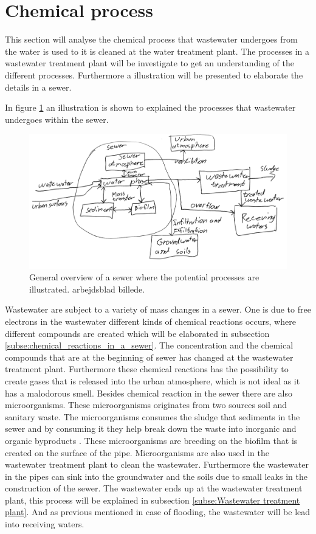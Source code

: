 \section{Chemical process}\label{se:chemical_process}
This section will analyse the chemical process that wastewater undergoes from the water is used to it is cleaned at the water treatment plant. The processes in a wastewater treatment plant will be investigate to get an understanding of the different processes. Furthermore a illustration will be presented to elaborate the details in a sewer. 

In figure \ref{fig:sewer_overview_of_the_different_parts} an illustration is shown to explained the processes that wastewater undergoes within the sewer.
\begin{figure}[H]
\centering
\includegraphics[width=1\textwidth]{report/introduction/pictures/detailed_sewer.pdf}
\caption{General overview of a sewer where the potential processes are illustrated. arbejdsblad billede. }
\label{fig:sewer_overview_of_the_different_parts}
\end{figure}
Wastewater are subject to a variety of mass changes in a sewer. One is due to free electrons in the wastewater different kinds of chemical reactions occurs, where different compounds are created which will be elaborated in subsection \ref{subse:chemical_reactions_in_a_sewer}. The concentration and the chemical compounds that are at the beginning of sewer has changed at the wastewater treatment plant. Furthermore these chemical reactions has the possibility to create gases that is released into the urban atmosphere, which is not ideal as it has a malodorous smell. Besides chemical reaction in the sewer there are also microorganisms. These microorganisms originates from two sources soil and sanitary waste. The microorganisms consumes the sludge that sediments in the sewer and by consuming it they help break down the waste into inorganic and organic byproducts \cite{bacteria_sewer}. These microorganisms are breeding on the biofilm that is created on the surface of the pipe. Microorganisms are also used in the wastewater treatment plant to clean the wastewater. Furthermore the wastewater in the pipes can sink into the groundwater and the soils due to small leaks in the construction of the sewer. The wastewater ends up at the wastewater treatment plant, this process will be explained in subsection \ref{subse:Wastewater treatment plant}. And as previous mentioned in case of flooding, the wastewater will be lead into receiving waters. 


